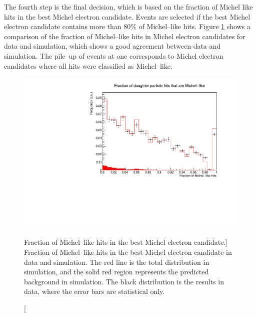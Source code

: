 The fourth step is the final decision, which is based on the fraction of Michel
like hits in the best Michel electron candidate. Events are selected if the 
best Michel electron candidate contains more than 80\% of Michel--like 
hits. Figure \ref{fig:michel_like_frac} shows a comparison of the fraction of 
Michel--like hits in Michel electron candidates for \protodune{} data and 
simulation, which shows a good agreement between data and simulation. The 
pile--up of events at one corresponds to Michel electron candidates where all 
hits were classified as Michel--like.
\begin{figure}
	\centering
	\includegraphics[width=\textwidth]{figures/michel_like_frac.pdf}
	\caption
	[Fraction of Michel--like hits in the best Michel electron candidate.]
	{Fraction of Michel--like hits in the best Michel electron candidate in data
	and simulation. The red line is the total distribution in simulation, and the 
	solid red region represents the predicted background in simulation. The black
	distribution is the results in data, where the error bars are statistical 
	only.}
	\label{fig:michel_like_frac}
\end{figure}

